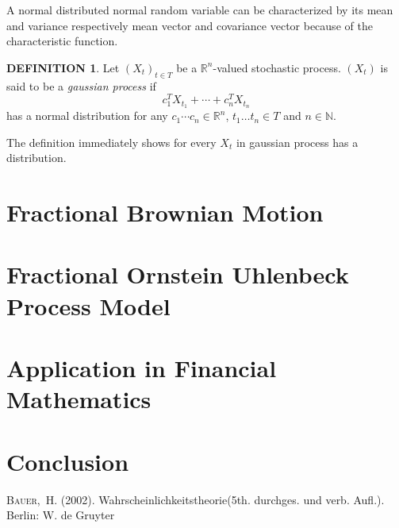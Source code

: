 \documentclass[a4paper, twoside, 11pt]{article}
\theoremstyle{definition}
\newtheorem{definition}{DEFINITION}[section]
\begin{document}
A normal distributed normal random variable can be characterized by its mean and variance respectively mean vector and covariance vector because of the characteristic function.

\begin{definition}
  Let $(X_t)_{t \in T}$ be a $\mathbb{R}^{n}$-valued stochastic process. $(X_t)$ is said to be a \emph{gaussian process} if 
  \[
	c_1^TX_{t_1} + \cdots + c_n^TX_{t_n} 
  \]
  has a normal distribution for any $c_1 \cdots c_n \in \mathbb{R}^{n}$, $t_1 \dots t_n \in T$ and $n \in \mathbb{N}$. 
\end{definition}
The definition immediately shows for every $X_t$ in gaussian process has a distribution.

\newpage

\section{Fractional Brownian Motion}

\newpage

\section{Fractional Ornstein Uhlenbeck Process Model}

\newpage

\section{Application in Financial Mathematics}

\newpage

\section{Conclusion}

\newpage

\fancyhead[LO, RE]{}
\begin{thebibliography}{99}
	 \textsc{Bauer,~H.} (2002). Wahrscheinlichkeitstheorie(5th. durchges. und verb. Aufl.). Berlin: W. de Gruyter

\end{thebibliography}
\newpage
\end{document}
